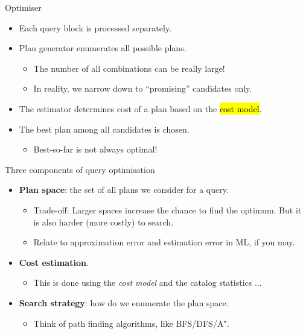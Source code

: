 \begin{frame}{Optimiser}
  \begin{itemize}
    \item Each query block is processed separately.
    \item Plan generator enumerates all possible plans. 
    \begin{itemize}
      \item The number of all combinations can be really large! 
      \item In reality, we narrow down to ``promising'' candidates only.
    \end{itemize}
    \item The estimator determines cost of a plan based on the \hl{cost model}.
    \item The best plan among all candidates is chosen. 
    \begin{itemize}
      \item Best-so-far is not always optimal!
    \end{itemize}
  \end{itemize}
\end{frame}

\begin{frame}{Three components of query optimisation}
  \begin{itemize}
    \item \textbf{Plan space}: the set of all plans we consider for a query. 
    \begin{itemize}
      \item Trade-off: Larger spaces increase the chance to find the optimum. But it is also harder (more costly) to search.
      \item Relate to approximation error and estimation error in ML, if you may.
    \end{itemize}
    \item \textbf{Cost estimation}.
    \begin{itemize}
      \item This is done using the \textit{cost model} and the catalog statistics ...
    \end{itemize}
    \item \textbf{Search strategy}: how do we enumerate the plan space. 
    \begin{itemize}
      \item Think of path finding algorithms, like BFS/DFS/A$^{\star}$.
    \end{itemize}
  \end{itemize}
\end{frame}

